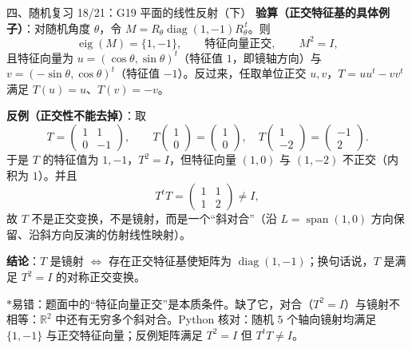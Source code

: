 \documentclass[aspectratio=169,10pt,fontset=none]{ctexbeamer}
\newcommand{\key}[1]{\textcolor{ink}{\bfseries #1}}
\newcommand{\starpt}{\textcolor{accent}{\bfseries$\ast$}}
\begin{document}
\begin{frame}[t]{四、随机复习 18/21：G19 平面的线性反射（下）}
\scriptsize
\key{验算（正交特征基的具体例子）}：对随机角度 $\theta$，令 $M=R_\theta\operatorname{diag}(1,-1)R_\theta^{\,t}$。则
\[ \operatorname{eig}(M)=\{1,-1\},\qquad \text{特征向量正交},\qquad M^2=I, \]
且特征向量为 $u=(\cos\theta,\sin\theta)^t$（特征值 $1$，即镜轴方向）与 $v=(-\sin\theta,\cos\theta)^t$（特征值 $-1$）。反过来，任取单位正交 $u,v$，$T=uu^t-vv^t$ 满足 $T(u)=u$、$T(v)=-v$。

\key{反例（正交性不能去掉）}：取
\[ T=\begin{pmatrix}1&1\\0&-1\end{pmatrix},\qquad T\begin{pmatrix}1\\0\end{pmatrix}=\begin{pmatrix}1\\0\end{pmatrix},\quad T\begin{pmatrix}1\\-2\end{pmatrix}=\begin{pmatrix}-1\\2\end{pmatrix}. \]
于是 $T$ 的特征值为 $1,-1$，$T^2=I$，但特征向量 $(1,0)$ 与 $(1,-2)$ 不正交（内积为 $1$）。并且
\[ T^tT=\begin{pmatrix}1&1\\1&2\end{pmatrix}\ne I, \]
故 $T$ 不是正交变换，不是镜射，而是一个“斜对合”（沿 $L=\operatorname{span}(1,0)$ 方向保留、沿斜方向反演的仿射线性映射）。

\key{结论}：$T$ 是镜射 $\iff$ 存在正交特征基使矩阵为 $\operatorname{diag}(1,-1)$；换句话说，$T$ 是满足 $T^2=I$ 的对称正交变换。

\starpt 易错：题面中的“特征向量正交”是本质条件。缺了它，对合（$T^2=I$）与镜射不相等：$\mathbb R^2$ 中还有无穷多个斜对合。Python 核对：随机 $5$ 个轴向镜射均满足 $\{1,-1\}$ 与正交特征向量；反例矩阵满足 $T^2=I$ 但 $T^tT\ne I$。
\end{frame}
\end{document}
